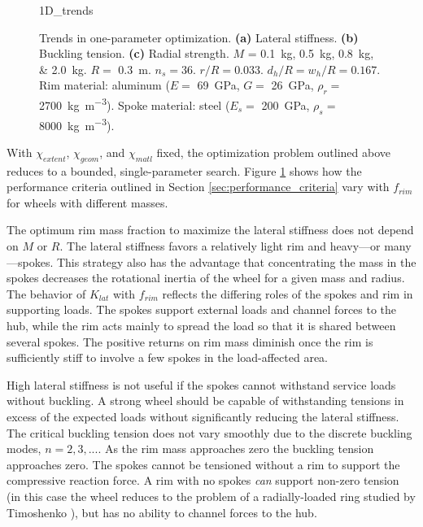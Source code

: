 \documentclass[\rootdir/thesis.tex]{subfiles}
\begin{document}


\begin{figure}
\centering
{1D_trends}
\caption{Trends in one-parameter optimization. \textbf{(a)} Lateral stiffness. \textbf{(b)} Buckling tension. \textbf{(c)} Radial strength. $M$ = \SIlist[list-units=single]{0.1;0.5;0.8;2.0}{kg}. $R=$ \SI{0.3}{m}. $n_s=36$. $r/R=0.033$. $d_h/R=w_h/R=0.167$. Rim material: aluminum ($E=$ \SI{69}{GPa}, $G=$ \SI{26}{GPa}, $\rho_r=$ \SI{2700}{kg.m^{-3}}). Spoke material: steel ($E_s=$ \SI{200}{GPa}, $\rho_s=$ \SI{8000}{kg.m^{-3}}).}
\label{fig:opt_1D_trends}
\end{figure}

With $\chi_{extent}$, $\chi_{geom}$, and $\chi_{matl}$ fixed, the optimization problem outlined above reduces to a bounded, single-parameter search. Figure \ref{fig:opt_1D_trends} shows how the performance criteria outlined in Section \ref{sec:performance_criteria} vary with $f_{rim}$ for wheels with different masses. 

The optimum rim mass fraction to maximize the lateral stiffness does not depend on $M$ or $R$. The lateral stiffness favors a relatively light rim and heavy---or many---spokes. This strategy also has the advantage that concentrating the mass in the spokes decreases the rotational inertia of the wheel for a given mass and radius. The behavior of $K_{lat}$ with $f_{rim}$ reflects the differing roles of the spokes and rim in supporting loads. The spokes support external loads and channel forces to the hub, while the rim acts mainly to spread the load so that it is shared between several spokes. The positive returns on rim mass diminish once the rim is sufficiently stiff to involve a few spokes in the load-affected area.

High lateral stiffness is not useful if the spokes cannot withstand service loads without buckling. A strong wheel should be capable of withstanding tensions in excess of the expected loads without significantly reducing the lateral stiffness. The critical buckling tension does not vary smoothly due to the discrete buckling modes, $n=2,3,...$. As the rim mass approaches zero the buckling tension approaches zero. The spokes cannot be tensioned without a rim to support the compressive reaction force. A rim with no spokes \emph{can} support non-zero tension (in this case the wheel reduces to the problem of a radially-loaded ring studied by Timoshenko \cite{Timoshenko1961}), but has no ability to channel forces to the hub.
\end{document}
